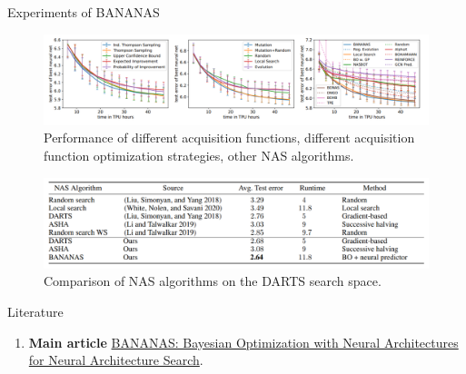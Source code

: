 \documentclass{beamer}
\begin{document}
\begin{frame}{Experiments of BANANAS}
    \begin{figure}
        \centering
        \includegraphics[scale=0.5]{images/bananas3.png}
        \caption{Performance of different acquisition functions, different acquisition function optimization strategies, other NAS algorithms.}
        \label{fig:enter-label}
    \end{figure}
    \begin{figure}
        \centering
        \includegraphics[scale=0.5]{images/bananas4.png}
        \caption{ Comparison of NAS algorithms on the DARTS search space.}
        \label{fig:enter-label}
    \end{figure}
\end{frame}
 


\begin{frame}{Literature}
    \begin{enumerate}
        \item \textbf{Main article} \href{https://arxiv.org/pdf/1910.11858.pdf}
        {BANANAS: Bayesian Optimization with Neural Architectures for Neural Architecture Search}.
    \end{enumerate}
\end{frame}
\end{document}
